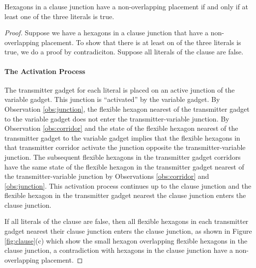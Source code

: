 \begin{lem}\label{lem:aux-1}
Hexagons in a clause junction have a non-overlapping placement if and only if at least one of the three literals is true.
\end{lem}
\begin{proof}
Suppose we have a hexagons in a clause junction that have a non-overlapping placement.
To show that there is at least on of the three literals is true,  we do a proof by contradiciton.
Suppose all literals of the clause are false.

\paragraph{The Activation Process} 
The transmitter gadget for each literal is placed on an active junction of the variable gadget. 
This junction is ``activated'' by the variable gadget.  
By Observation \ref{obs:junction}, the flexible hexagon nearest of the transmitter gadget to the variable gadget does not enter the transmitter-variable junction.
By Observation \ref{obs:corridor} and the state of the flexible hexagon nearest of the transmitter gadget to the variable gadget implies that the flexible hexagons in that transmitter corridor activate the junction opposite the transmitter-variable junction.
The subsequent flexible hexagons in the transmitter gadget corridors have the same state of the flexible hexagon in the transmitter gadget nearest of the transmitter-variable junction by Observations \ref{obs:corridor} and \ref{obs:junction}.
This activation process continues up to the clause junction and the flexible hexagon in the transmitter gadget nearest the clause junction enters the clause junction.

If all literals of the clause are false, then all flexible hexagons in each transmitter gadget nearest their clause junction enters the clause junction, as shown in Figure \ref{fig:clause}(c) which show the small hexagon overlapping flexible hexagons in the clause junction, a contradiction with hexagons in the clause junction have a non-overlapping placement.
\end{proof}

